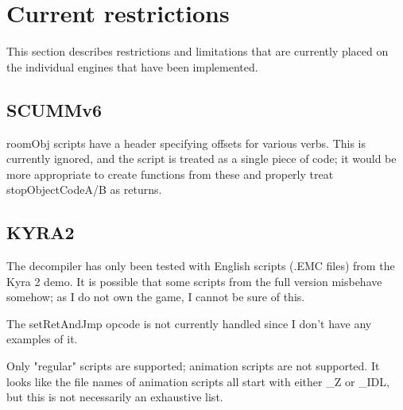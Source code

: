 \section{Current restrictions}
This section describes restrictions and limitations that are currently placed on the individual engines that have been implemented.

\subsection{SCUMMv6}
roomObj scripts have a header specifying offsets for various verbs. This is currently ignored, and the script is treated as a single piece of code; it would be more appropriate to create functions from these and properly treat stopObjectCodeA/B as returns.

\subsection{KYRA2}
The decompiler has only been tested with English scripts (.EMC files) from the Kyra 2 demo. It is possible that some scripts from the full version misbehave somehow; as I do not own the game, I cannot be sure of this.

The setRetAndJmp opcode is not currently handled since I don't have any examples of it.

Only "regular" scripts are supported; animation scripts are not supported. It looks like the file names of animation scripts all start with either \_Z or \_IDL, but this is not necessarily an exhaustive list.
